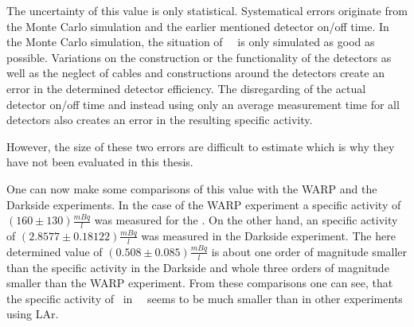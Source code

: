 \documentclass[encoding=utf8,british]{tumphthesis}
\begin{document}
The uncertainty of this value is only statistical.
Systematical errors originate from the Monte Carlo simulation and the earlier mentioned detector on/off time. 
In the Monte Carlo simulation, the situation of \gerda\ \PII\ is only simulated as good as possible.
Variations on the construction or the functionality of the detectors as well as the neglect of cables and constructions around the detectors create an error in the determined detector efficiency.
The disregarding of the actual detector on/off time and instead using only an average measurement time for all detectors also creates an error in the resulting specific activity.

However, the size of these two errors are difficult to estimate which is why they have not been evaluated in this thesis.


\iffalse

One can now make some comparisons of this value with the WARP and the Darkside experiments.
In the case of the WARP experiment a specific activity of $(160\pm130) \frac{\unit{mBq}}{\unit{l}}$ \label{} was measured for the \Kr.
On the other hand, an specific activity of $(2.8577 \pm 0.18122) \frac{\unit{mBq}}{\unit{l}}$ was measured in the Darkside experiment.
The here determined value of $(0.508\pm0.085) \frac{\unit{mBq}}{\unit{l}}$ is about one order of magnitude smaller than the specific activity in the Darkside and whole three orders of magnitude smaller than the WARP experiment.
From these comparisons one can see, that the specific activity of \Kr\ in \gerda\ \PII\ seems to be much smaller than in other experiments using LAr.
\\
\end{document}

